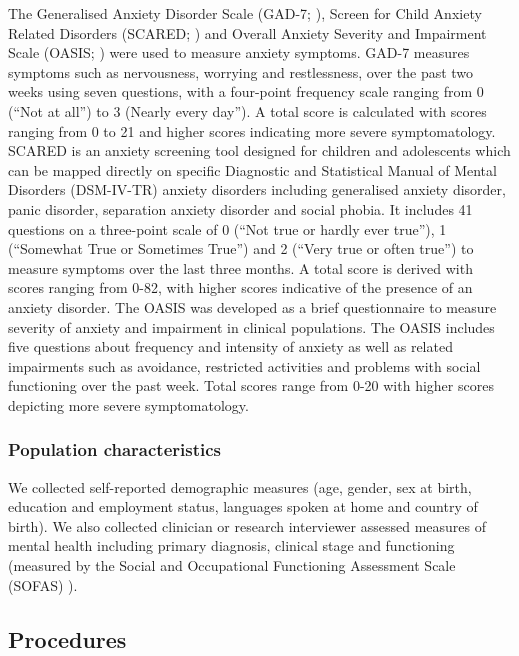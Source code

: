 \documentclass[
  journal=largetwo,
  manuscript=original-article,
  year=2023-Submission,
]{cup-journal}
\begin{document}
The Generalised Anxiety Disorder Scale (GAD-7; \autocite{RN13}), Screen for Child Anxiety Related Disorders (SCARED; \autocite{RN14}) and Overall Anxiety Severity and Impairment Scale (OASIS; \autocite{RN15}) were used to measure anxiety symptoms. GAD-7 measures symptoms such as nervousness, worrying and restlessness, over the past two weeks using seven questions, with a four-point frequency scale ranging from 0 (``Not at all'') to 3 (Nearly every day''). A total score is calculated with scores ranging from 0 to 21 and higher scores indicating more severe symptomatology. SCARED is an anxiety screening tool designed for children and adolescents which can be mapped directly on specific Diagnostic and Statistical Manual of Mental Disorders (DSM-IV-TR) anxiety disorders including generalised anxiety disorder, panic disorder, separation anxiety disorder and social phobia. It includes 41 questions on a three-point scale of 0 (``Not true or hardly ever true''), 1 (``Somewhat True or Sometimes True'') and 2 (``Very true or often true'') to measure symptoms over the last three months. A total score is derived with scores ranging from 0-82, with higher scores indicative of the presence of an anxiety disorder. The OASIS was developed as a brief questionnaire to measure severity of anxiety and impairment in clinical populations. The OASIS includes five questions about frequency and intensity of anxiety as well as related impairments such as avoidance, restricted activities and problems with social functioning over the past week. Total scores range from 0-20 with higher scores depicting more severe symptomatology.

\subsubsection{Population characteristics}

We collected self-reported demographic measures (age, gender, sex at birth, education and employment status, languages spoken at home and country of birth). We also collected clinician or research interviewer assessed measures of mental health including primary diagnosis, clinical stage \autocite{McGorry_2006} and functioning (measured by the Social and Occupational Functioning Assessment Scale (SOFAS) \autocite{Goldman_1992}).

\subsection{Procedures}
\end{document}
